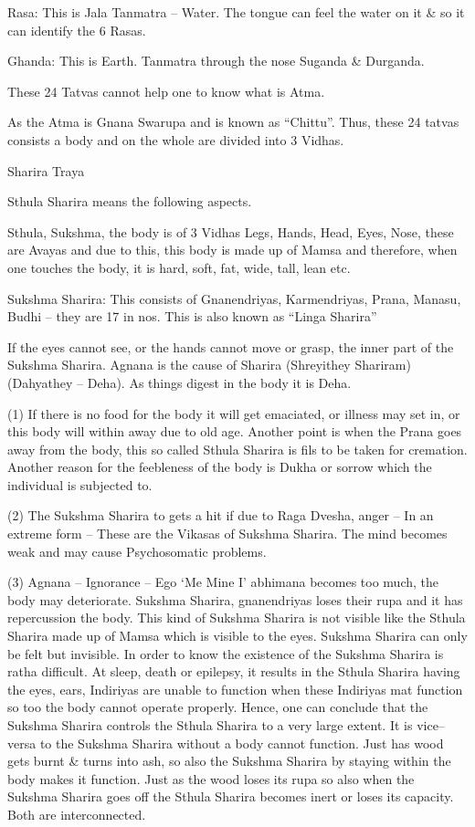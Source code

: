  \item Rasa: This is Jala Tanmatra – Water. The tongue can feel the water on it \& so it can identify the 6 Rasas.

 \item Ghanda: This is Earth. Tanmatra through the nose Suganda \& Durganda.

These 24 Tatvas cannot help one to know what is Atma.

As the Atma is Gnana Swarupa and is known as “Chittu”. Thus, these 24 tatvas consists a body and on the whole are divided into 3 Vidhas.

Sharira Traya

Sthula Sharira means the following aspects.

Sthula, Sukshma, the body is of 3 Vidhas Legs, Hands, Head, Eyes, Nose, these are Avayas and due to this, this body is made up of Mamsa and therefore, when one touches the body, it is hard, soft, fat, wide, tall, lean etc.

Sukshma Sharira: This consists of Gnanendriyas, Karmendriyas, Prana, Manasu, Budhi – they are 17 in nos. This is also known as “Linga Sharira”

If the eyes cannot see, or the hands cannot move or grasp, the inner part of the Sukshma Sharira. Agnana is the cause of Sharira (Shreyithey Shariram) (Dahyathey – Deha). As things digest in the body it is Deha.

(1) If there is no food for the body it will get emaciated, or illness may set in, or this body will within away due to old age. Another point is when the Prana goes away from the body, this so called Sthula Sharira is fils to be taken for cremation. Another reason for the feebleness of the body is Dukha or sorrow which the individual is subjected to.

(2) The Sukshma Sharira to gets a hit if due to Raga Dvesha, anger – In an extreme form – These are the Vikasas of Sukshma Sharira. The mind becomes weak and may cause Psychosomatic problems.

(3) Agnana – Ignorance – Ego ‘Me Mine I’ abhimana becomes too much, the body may deteriorate. Sukshma Sharira, gnanendriyas loses their rupa and it has repercussion the body. This kind of Sukshma Sharira is not visible like the Sthula Sharira made up of Mamsa which is visible to the eyes. Sukshma Sharira can only be felt but invisible. In order to know the existence of the Sukshma Sharira is ratha difficult. At sleep, death or epilepsy, it results in the Sthula Sharira having the eyes, ears, Indiriyas are unable to function when these Indiriyas mat function so too the body cannot operate properly. Hence, one can conclude that the Sukshma Sharira controls the Sthula Sharira to a very large extent. It is vice–versa to the Sukshma Sharira without a body cannot function. Just has wood gets burnt \& turns into ash, so also the Sukshma Sharira by staying within the body makes it function. Just as the wood loses its rupa so also when the Sukshma Sharira goes off the Sthula Sharira becomes inert or loses its capacity. Both are interconnected.

